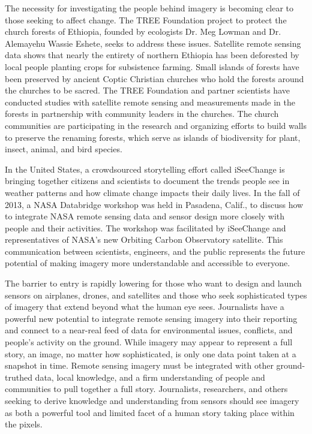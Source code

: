 \begin{itemize}
\begin{itemized}
The necessity for investigating the people behind imagery is becoming clear
to those seeking to affect change. The TREE Foundation project to protect
the church forests of Ethiopia, founded by ecologists Dr. Meg Lowman and
Dr. Alemayehu Wassie Eshete, seeks to address these issues. Satellite remote
sensing data shows that nearly the entirety of northern Ethiopia has been
deforested by local people planting crops for subsistence farming. Small
islands of forests have been preserved by ancient Coptic Christian churches
who hold the forests around the churches to be sacred. The TREE Foundation
and partner scientists have conducted studies with satellite remote
sensing and measurements made in the forests in partnership with community
leaders in the churches. The church communities are participating in the research and organizing efforts to build walls to preserve the renaming
forests, which serve as islands of biodiversity for plant, insect, animal, and
bird species.

In the United States, a crowdsourced storytelling effort called iSeeChange
is bringing together citizens and scientists to document the trends people
see in weather patterns and how climate change impacts their daily lives. In
the fall of 2013, a NASA Databridge workshop was held in Pasadena, Calif.,
to discuss how to integrate NASA remote sensing data and sensor design
more closely with people and their activities. The workshop was facilitated
by iSeeChange and representatives of NASA's new Orbiting Carbon Observatory
satellite. This communication between scientists, engineers, and the
public represents the future potential of making imagery more understandable
and accessible to everyone.

The barrier to entry is rapidly lowering for those who want to design and
launch sensors on airplanes, drones, and satellites and those who seek
sophisticated types of imagery that extend beyond what the human eye sees.
Journalists have a powerful new potential to integrate remote sensing imagery
into their reporting and connect to a near-real feed of data for environmental
issues, conflicts, and people's activity on the ground. While imagery
may appear to represent a full story, an image, no matter how sophisticated,
is only one data point taken at a snapshot in time. Remote sensing imagery
must be integrated with other ground-truthed data, local knowledge,
and a firm understanding of people and communities to pull together a full
story. Journalists, researchers, and others seeking to derive knowledge and
understanding from sensors should see imagery as both a powerful tool and
limited facet of a human story taking place within the pixels.



\end{itemized}
\end{itemize}
